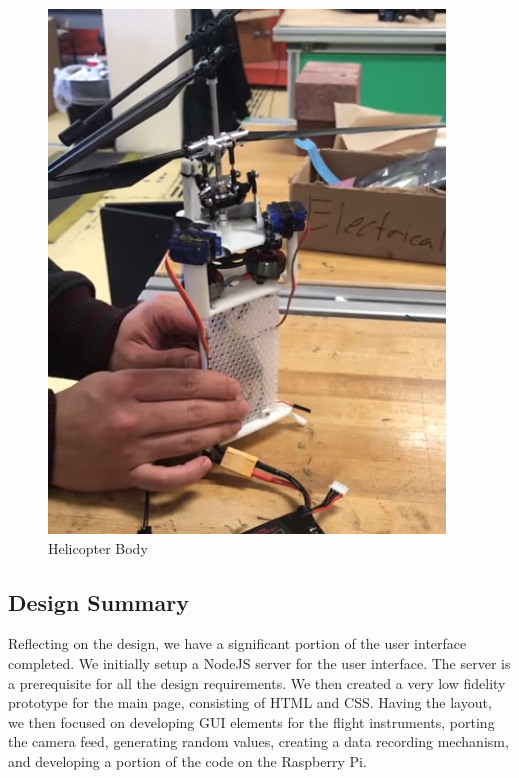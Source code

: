 \documentclass[onecolumn, oneside, letterpaper, draftclsnofoot, 10pt, compsoc]{IEEEtran}
\begin{document}
\begin{figure}[H]
    \centering
    \includegraphics{graphics/Helicopter.PNG}
    \caption{Helicopter Body}
    \label{fig:heli}
\end{figure}

\subsection{Design Summary}
\noindent
Reflecting on the design, we have a significant portion of the user interface completed. We initially setup a NodeJS server for the user interface. The server is a prerequisite for all the design requirements. We then created a very low fidelity prototype for the main page, consisting of HTML and CSS. Having the layout, we then focused on developing GUI elements for the flight instruments, porting the camera feed, generating random values, creating a data recording mechanism, and developing a portion of the code on the Raspberry Pi.
\end{document}
